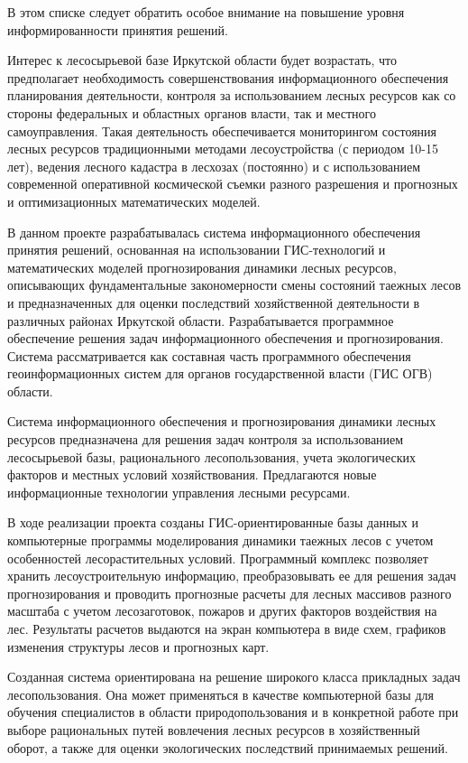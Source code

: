 \documentclass{report}
\begin{document}
В этом списке следует обратить особое внимание на повышение уровня информированности принятия решений. 

Интерес к лесосырьевой базе Иркутской области будет возрастать, что предполагает необходимость совершенствования
информационного обеспечения планирования деятельности, контроля за использованием лесных ресурсов как со стороны
федеральных и областных органов власти, так и местного самоуправления. Такая деятельность обеспечивается мониторингом
состояния лесных ресурсов традиционными методами лесоустройства (с периодом 10-15 лет), ведения лесного кадастра в
лесхозах (постоянно) и с использованием современной оперативной космической съемки разного разрешения и  прогнозных и
оптимизационных математических моделей.  

В данном проекте разрабатывалась система информационного обеспечения принятия решений, основанная на использовании
ГИС-технологий и математических моделей прогнозирования динамики лесных ресурсов, описывающих фундаментальные
закономерности смены состояний таежных лесов и предназначенных для оценки последствий хозяйственной деятельности в
различных районах Иркутской области. Разрабатывается программное обеспечение решения задач информационного обеспечения
и прогнозирования. Система рассматривается как составная часть программного обеспечения геоинформационных систем для
органов государственной власти (ГИС ОГВ) области.

Система информационного обеспечения и прогнозирования динамики лесных ресурсов предназначена для решения задач контроля
за использованием лесосырьевой базы, рационального лесопользования, учета экологических факторов и местных условий
хозяйствования. Предлагаются новые информационные технологии управления лесными ресурсами.

В ходе реализации проекта созданы ГИС-ориентированные базы данных и компьютерные программы моделирования динамики
таежных лесов с учетом особенностей лесорастительных условий. Программный комплекс позволяет хранить лесоустроительную
информацию, преобразовывать ее для решения задач прогнозирования и проводить прогнозные расчеты для лесных массивов
разного масштаба с учетом лесозаготовок, пожаров и других факторов воздействия на лес. Результаты расчетов выдаются на
экран компьютера в виде схем, графиков изменения структуры лесов и прогнозных карт.

Созданная система ориентирована на решение широкого класса прикладных задач лесопользования. Она может применяться  в
качестве компьютерной базы для обучения специалистов в области природопользования и в конкретной работе при выборе
рациональных путей вовлечения лесных ресурсов в хозяйственный оборот, а также для оценки экологических последствий
принимаемых решений. 
\end{document}
